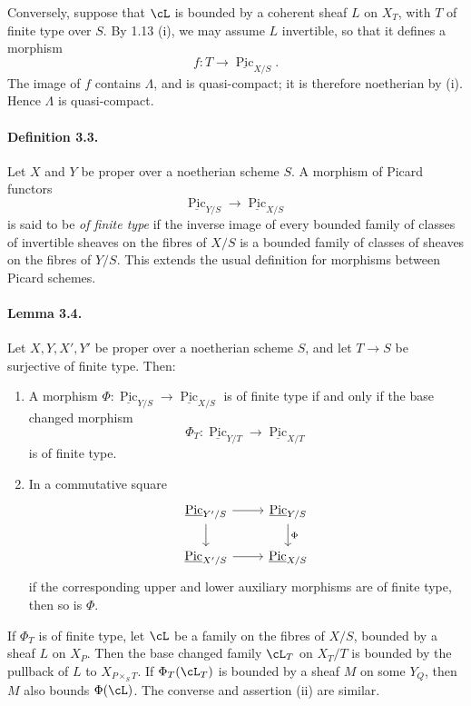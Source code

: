 \documentclass[11pt]{article}
\theoremstyle{plain}
\theoremstyle{definition}
\theoremstyle{remark}
\DeclareMathOperator{\Pic}{Pic}
\newcommand{\longto}{\longrightarrow}
\begin{document}
Conversely, suppose that $\cL$ is bounded by a coherent sheaf $L$ on $X_T$, with $T$ of finite type over $S$. By 1.13 (i), we may assume $L$ invertible, so that it defines a morphism
\[
f:T\longto \underline{\Pic}_{X/S}.
\]
The image of $f$ contains $\Lambda$, and is quasi-compact; it is therefore noetherian by (i). Hence $\Lambda$ is quasi-compact.

\paragraph{Definition 3.3.}
Let $X$ and $Y$ be proper over a noetherian scheme $S$. A morphism of Picard functors
\[
\underline{\Pic}_{Y/S}\longto \underline{\Pic}_{X/S}
\]
is said to be \emph{of finite type} if the inverse image of every bounded family of classes of invertible sheaves on the fibres of $X/S$ is a bounded family of classes of sheaves on the fibres of $Y/S$. This extends the usual definition for morphisms between Picard schemes.

\paragraph{Lemma 3.4.}
Let $X,Y,X',Y'$ be proper over a noetherian scheme $S$, and let $T\to S$ be surjective of finite type. Then:
\begin{enumerate}[label=\roman*)]
\item A morphism $\Phi:\underline{\Pic}_{Y/S}\to\underline{\Pic}_{X/S}$ is of finite type if and only if the base changed morphism
\[
\Phi_T:\underline{\Pic}_{Y/T}\to\underline{\Pic}_{X/T}
\]
is of finite type.
\item In a commutative square
\[
\begin{tikzcd}
\underline{\Pic}_{Y'/S} \arrow[r]\arrow[d] &
\underline{\Pic}_{Y/S}\arrow[d,"\Phi"]\\
\underline{\Pic}_{X'/S} \arrow[r] &
\underline{\Pic}_{X/S}
\end{tikzcd}
\]
if the corresponding upper and lower auxiliary morphisms are of finite type, then so is $\Phi$.
\end{enumerate}

If $\Phi_T$ is of finite type, let $\cL$ be a family on the fibres of $X/S$, bounded by a sheaf $L$ on $X_P$. Then the base changed family $\cL_T$ on $X_T/T$ is bounded by the pullback of $L$ to $X_{P\times_S T}$. If $\Phi_T(\cL_T)$ is bounded by a sheaf $M$ on some $Y_Q$, then $M$ also bounds $\Phi(\cL)$. The converse and assertion (ii) are similar.
\end{document}
